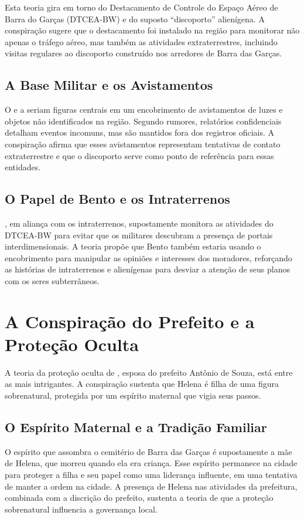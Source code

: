 Esta teoria gira em torno do Destacamento de Controle do Espaço Aéreo de Barra do Garças (DTCEA-BW) e do suposto ``discoporto'' alienígena. A conspiração sugere que o destacamento foi instalado na região para monitorar não apenas o tráfego aéreo, mas também as atividades extraterrestres, incluindo visitas regulares ao discoporto construído nos arredores de Barra das Garças.

\subsection{A Base Militar e os Avistamentos}
O  e a  seriam figuras centrais em um encobrimento de avistamentos de luzes e objetos não identificados na região. Segundo rumores, relatórios confidenciais detalham eventos incomuns, mas são mantidos fora dos registros oficiais. A conspiração afirma que esses avistamentos representam tentativas de contato extraterrestre e que o discoporto serve como ponto de referência para essas entidades.

\subsection{O Papel de Bento e os Intraterrenos}
, em aliança com os intraterrenos, supostamente monitora as atividades do DTCEA-BW para evitar que os militares descubram a presença de portais interdimensionais. A teoria propõe que Bento também estaria usando o encobrimento para manipular as opiniões e interesses dos moradores, reforçando as histórias de intraterrenos e alienígenas para desviar a atenção de seus planos com os seres subterrâneos.

\section{A Conspiração do Prefeito e a Proteção Oculta}

A teoria da proteção oculta de , esposa do prefeito Antônio de Souza, está entre as mais intrigantes. A conspiração sustenta que Helena é filha de uma figura sobrenatural, protegida por um espírito maternal que vigia seus passos.

\subsection{O Espírito Maternal e a Tradição Familiar}
O espírito que assombra o cemitério de Barra das Garças é supostamente a mãe de Helena, que morreu quando ela era criança. Esse espírito permanece na cidade para proteger a filha e seu papel como uma liderança influente, em uma tentativa de manter a ordem na cidade. A presença de Helena nas atividades da prefeitura, combinada com a discrição do prefeito, sustenta a teoria de que a proteção sobrenatural influencia a governança local.

